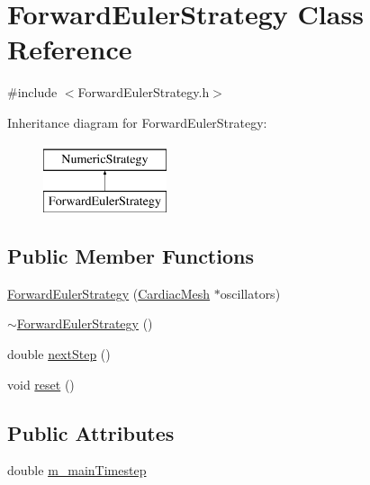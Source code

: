 \hypertarget{class_forward_euler_strategy}{\section{Forward\+Euler\+Strategy Class Reference}
\label{class_forward_euler_strategy}
}


{\ttfamily \#include $<$Forward\+Euler\+Strategy.\+h$>$}

Inheritance diagram for Forward\+Euler\+Strategy\+:\begin{figure}[H]
\begin{center}
\leavevmode
\includegraphics[height=2.000000cm]{class_forward_euler_strategy}
\end{center}
\end{figure}
\subsection*{Public Member Functions}
\begin{DoxyCompactItemize}
\item 
\hyperlink{class_forward_euler_strategy_a34072c0f458fb7946733717cf05956a4}{Forward\+Euler\+Strategy} (\hyperlink{class_cardiac_mesh}{Cardiac\+Mesh} $\ast$oscillators)
\item 
\hyperlink{class_forward_euler_strategy_a2c712bdc098b10499d8033b14302526c}{$\sim$\+Forward\+Euler\+Strategy} ()
\item 
double \hyperlink{class_forward_euler_strategy_a3a382585c2d87ffaf370c07c37737a28}{next\+Step} ()
\item 
void \hyperlink{class_forward_euler_strategy_aedd8186805189522eebfafce55617bb9}{reset} ()
\end{DoxyCompactItemize}
\subsection*{Public Attributes}
\begin{DoxyCompactItemize}
\item 
double \hyperlink{class_forward_euler_strategy_aa7cb67aa11fb16d4a76c1944ad3dbbc4}{m\+\_\+main\+Timestep}
\end{DoxyCompactItemize}


